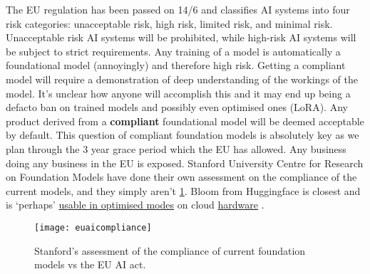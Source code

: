 The EU regulation has been passed on 14/6 and classifies AI systems into four risk categories: unacceptable risk, high risk, limited risk, and minimal risk. Unacceptable risk AI systems will be prohibited, while high-risk AI systems will be subject to strict requirements. Any training of a model is automatically a foundational model (annoyingly) and therefore high risk. Getting a compliant model will require a demonstration of deep understanding of the workings of the model. It's unclear how anyone will accomplish this and it may end up being a defacto ban on trained models and possibly even optimised ones (LoRA). Any product derived from a \textbf{compliant} foundational model will be deemed acceptable by default. This question of compliant foundation models is absolutely key as we plan through the 3 year grace period which the EU has allowed. Any business doing any business in the EU is exposed. Stanford University Centre for Research on Foundation Models have done their own assessment on the compliance of the current models, and they simply aren't \ref{fig:euAIcompliance}. Bloom from Huggingface is closest and is `perhaps' \href{https://huggingface.co/BelleGroup/BELLE_BLOOM_GPTQ_4BIT}{usable in optimised modes} on cloud \href{https://lambdalabs.com/nvidia-h100-gpus}{hardware} \cite{dettmers2022case}. 

\begin{figure}[H]
    \centering
    \texttt{[image: euaicompliance]}
    \caption{Stanford's assessment of the compliance of current foundation models vs the EU AI act.}
    \label{fig:euAIcompliance}
\end{figure}

